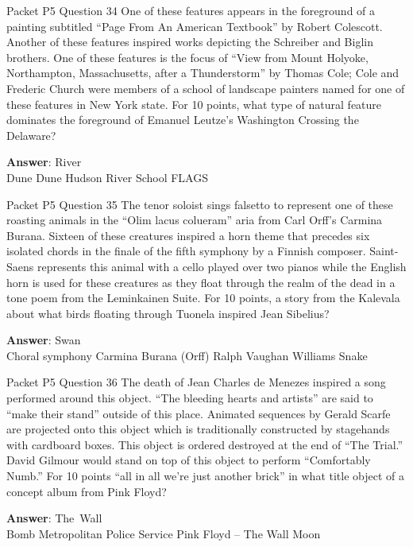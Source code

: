 \begin{frame}{Packet P5 Question 34}
One of these features   appears in the foreground of a painting subtitled “Page From An American Textbook” by Robert Colescott. Another of these features inspired works depicting the Schreiber and Biglin brothers. One of these features is the focus of ``View from Mount Holyoke, Northampton, Massachusetts, after a Thunderstorm'' by Thomas Cole;   Cole and Frederic Church were members of a school of landscape painters named for   one of these features in New York state. For 10 points, what type of natural feature dominates the foreground of Emanuel Leutze’s Washington Crossing the Delaware?  

\textbf{Answer}: River\\
 Dune
 Dune
 Hudson River School
 FLAGS
\end{frame}

\begin{frame}{Packet P5 Question 35}
The tenor soloist sings   falsetto to represent   one of these roasting animals in the “Olim lacus colueram” aria from Carl Orff’s Carmina Burana. Sixteen of these creatures inspired a horn theme that precedes six isolated chords in the finale of the fifth symphony by a Finnish composer. Saint-Saens represents this animal with a cello played over two pianos while the English horn is used for these creatures as they float through the realm of the dead in a tone poem from the Leminkainen Suite. For 10 points, a story from the Kalevala about what birds floating through Tuonela inspired Jean Sibelius?    

\textbf{Answer}: Swan\\
 Choral symphony
 Carmina Burana (Orff)
 Ralph Vaughan Williams
 Snake
\end{frame}

\begin{frame}{Packet P5 Question 36}
The death of Jean Charles de Menezes inspired     a song performed around this object. “The bleeding hearts and artists” are said to “make their stand” outside of this place. Animated sequences by Gerald Scarfe are projected onto this object which is traditionally constructed by stagehands with cardboard boxes. This object is ordered destroyed at the end of “The Trial.” David Gilmour would stand on top of this object to perform “Comfortably Numb.” For 10 points “all in all we’re just another brick” in what title object of a concept album from Pink Floyd?    

\textbf{Answer}: The\ Wall\\
 Bomb
 Metropolitan Police Service
 Pink Floyd – The Wall
 Moon
\end{frame}

